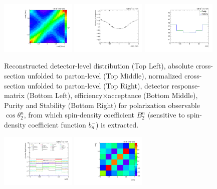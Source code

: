 \begin{refsection}
\begin{figure}[htb]
\begin{center}
 \includegraphics[width=0.32\textwidth]{fig_fullRun2UL/unfolding/combined/ResponseMatrix_b2n.pdf}
 \includegraphics[width=0.32\textwidth]{fig_fullRun2UL/unfolding/combined/TotEff_b2n.pdf}
 \includegraphics[width=0.32\textwidth]{fig_fullRun2UL/unfolding/combined/PurStab_b2n.pdf} \\
\caption{Reconstructed detector-level distribution (Top Left), absolute cross-section unfolded to parton-level (Top Middle), normalized cross-section unfolded to parton-level (Top Right), detector response-matrix (Bottom Left), efficiency$\times$acceptance (Bottom Middle), Purity and Stability (Bottom Right) for polarization observable $\cos\theta_{2}^{n}$, from which spin-density coefficient $B_{2}^{n}$ (sensitive to spin-density coefficient function $b_n^{-}$) is extracted.}
\label{fig:b2n}
\end{center}
\end{figure}
\clearpage
\begin{figure}[htb]
\begin{center}
 \includegraphics[width=0.32\textwidth]{fig_fullRun2UL/unfolding/combined/deltaSystCombinedlog_rebinnedB_b2n.pdf}
 \includegraphics[width=0.32\textwidth]{fig_fullRun2UL/unfolding/combined/StatCovMatrix_rebinnedB_b2n.pdf}

\end{center}
\end{figure}
\end{refsection}
